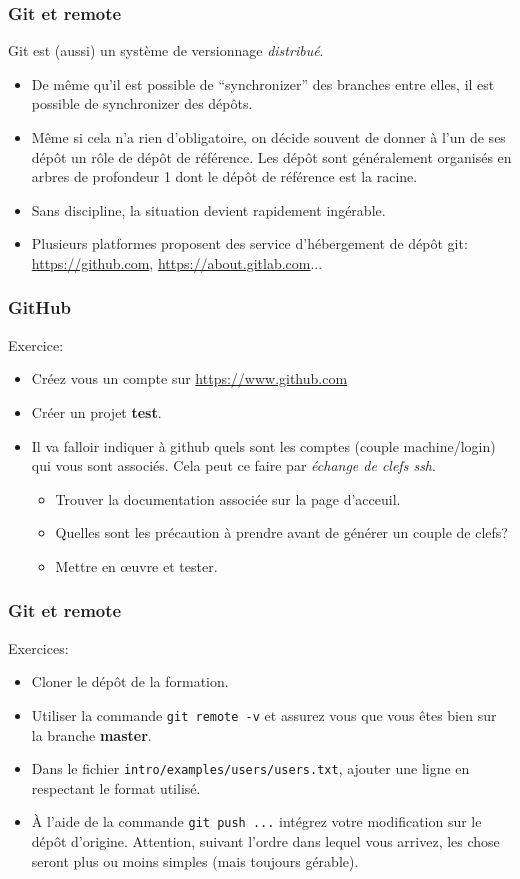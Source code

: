 \documentclass{beamer}
\begin{document}
\begin{frame}[fragile]\frametitle{Git et remote}
  Git est (aussi) un système de versionnage {\em distribué}.
  \begin{itemize}
    \item De même qu'il est possible de ``synchronizer'' des branches entre elles, il est possible de synchronizer des dépôts.
    \item Même si cela n'a rien d'obligatoire, on décide souvent de donner à l'un de ses dépôt un rôle de dépôt de référence. Les dépôt sont généralement organisés en arbres de profondeur 1 dont le dépôt de référence est la racine.
    \item Sans discipline, la situation devient rapidement ingérable.
    \item Plusieurs platformes proposent des service d'hébergement de dépôt git: \url{https://github.com}, \url{https://about.gitlab.com}...
  \end{itemize}
\end{frame}

\begin{frame}[fragile]\frametitle{GitHub}
  
  Exercice:
  \begin{itemize}
  \item Créez vous un compte sur \url{https://www.github.com}
  \item Créer un projet {\bf test}.
  \item Il va falloir indiquer à github quels sont les comptes (couple machine/login) qui vous sont associés. Cela peut ce faire par {\em échange de clefs ssh}. 
    \begin{itemize}
    \item Trouver la documentation associée sur la page d'acceuil.
    \item Quelles sont les précaution à prendre avant de générer un couple de clefs?
    \item Mettre en œuvre et tester.
    \end{itemize}
  \end{itemize}
\end{frame}

\begin{frame}[fragile]\frametitle{Git et remote}
  Exercices: 
  \begin{itemize}
  \item Cloner le dépôt de la formation.
  \item Utiliser la commande {\tt git remote -v} et assurez vous que vous êtes bien sur la branche {\bf master}.
  \item Dans le fichier {\tt intro/examples/users/users.txt}, ajouter une ligne en respectant le format utilisé.
  \item À l'aide de la commande {\tt git push ...} intégrez votre modification sur le dépôt d'origine. Attention, suivant l'ordre dans lequel vous arrivez, les chose seront plus ou moins simples (mais toujours gérable).
  \end{itemize}
\end{frame}
\end{document}
